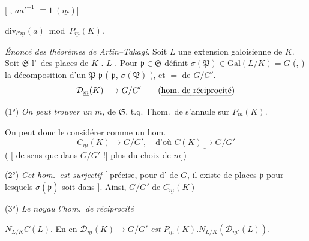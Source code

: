 \documentclass[11pt,a4paper]{article}
\begin{document}
[\struck{\ill{}} \ill{} \ill{} \ill{},  $a a'^{-1}$
\struck{\ill{}} $\equiv 1 \ (\underline{m})$]

 \ill{} $\mathrm{div}_{\mathcal{C}\underline{m}}(a) \bmod P_{\underline{m}}(K)$.

\emph{Énoncé des théorèmes de Artin--Takagi}. Soit $L$ une extension
galoisienne  de $K$. \struck{\ill{}} \ill{} Soit
$\mathfrak{S}$ l'\ des places de $K$ \ill{}. $L$ \ill{} \ill{}
. Pour $\mathfrak{p} \in \mathfrak{S}$ \ill{}
\ill{} définit $\sigma(\mathfrak{P}) \in \mathrm{Gal}(L/K) = G$ (\ill{},
\ill{} \ill{} \ill{}) \ill{} \ill{} \ill{} la décomposition d'un
$\mathfrak{P}$ \ill{} \ill{} \ill{} $\mathfrak{p}$ (\ill{} \ill{} \ill{}
$\mathfrak{p}$, $\sigma(\mathfrak{P})$ \ill{} \ill{} \ill{} \ill{} \ill{}
\ill{} ), et \ill{} \ill{} \ill{} \ill{} $=$
 de $G/G'$.  \ill{} \ill{} \ill{}
 \ill{} \ill{} 
\[
\mathcal{D}_{\underline{m}}(K) \longrightarrow G/G' \qquad (\text{\uncertain{hom.\ de réciprocité}})
\]

(1°) \emph{On peut trouver un  $\underline{m}$}, de
 $\mathfrak{S}$, t.q.\ l'hom.\ de 
s'annule sur $P_{\underline{m}}(K)$.

On peut donc le considérer comme un hom.
\[
C_{\underline{m}}(K) \to G/G', \quad \text{d'où } \underline{C(K) \to G/G'}
\]
( \ill{} \ill{} \ill{} \ill{} 
[ de sens que dans $G/G'$ !] \ill{} plus du choix de
$\underline{m}$])

(2°) \emph{Cet hom.\ est surjectif} [\ill{}  
précise, pour \ill{} \ill{} d'\ill{} de $G$, il existe \ill{} \emph{\ill{}
\ill{}} de places $\mathfrak{p}$ pour lesquels $\sigma(\bar{\mathfrak{p}})$
soit dans \ill{} \ill{} \ill{} \emph{\ill{}} \ill{} \ill{}]. Ainsi, $G/G'$
\ill{} \ill{} \ill{} de $C_{\underline{m}}(K)$

(3°) \emph{Le noyau  l'hom.\ de réciprocité}

\ill{} \ill{}  \ill{} \ill{}
 $N_{L/K}C(L)$. En \ill{} \ill{} \ill{} \ill{} \ill{}
en $\mathcal{D}_{\underline{m}}(K) \to G/G'$
\emph{est } $P_{\underline{m}}(K) . N_{L/K}(\mathcal{D}_{\underline{m}'}(L))$\add{\ill{}}.
\end{document}
